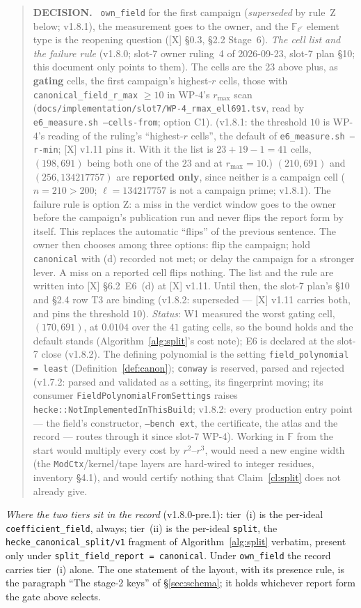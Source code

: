 \documentclass[11pt]{article}
\theoremstyle{remark}
\newcommand{\F}{\mathbb{F}}
\newcommand{\Flr}{\F_{\ell^r}}
\newenvironment{decisionbox}
  {\par\medskip\noindent\begin{quote}\textbf{DECISION.}\ }
  {\end{quote}\medskip}
\begin{document}
\begin{decisionbox}
\texttt{own\_field} for the first campaign (\emph{superseded} by rule~Z below; v1.8.1), the measurement goes to the owner, and the $\Flr$
element type is the reopening question ([X] \S0.3, \S2.2 Stage~6). \emph{The cell list and the
failure rule} (v1.8.0; slot-7 owner ruling~4 of 2026-09-23, slot-7 plan \S10; this document only
points to them). The cells are the $23$ above plus, as \textbf{gating} cells, the first
campaign's highest-$r$ cells, those with \texttt{canonical\_field\_r\_max} $\ge10$ in WP-4's
$r_{\max}$ scan (\texttt{docs/implementation/slot7/WP-4\_rmax\_ell691.tsv}, read by
\texttt{e6\_measure.sh --cells-from}; option C1). (v1.8.1: the threshold $10$ is WP-4's reading
of the ruling's ``highest-$r$ cells'', the default of \texttt{e6\_measure.sh --r-min}; [X] v1.11
pins it. With it the list is $23+19-1=41$ cells, $(198,691)$ being both one of the $23$ and at
$r_{\max}=10$.) $(210,691)$ and $(256,134217757)$ are
\textbf{reported only}, since neither is a campaign cell ($n=210>200$; $\ell=134217757$ is not a
campaign prime; v1.8.1). The failure rule is option Z: a miss in the verdict window goes to the
owner before the campaign's publication run and never flips the report form by itself. This
replaces the automatic ``flips'' of the previous sentence. The owner then chooses among three
options: flip the campaign; hold \texttt{canonical} with (d) recorded not met; or delay the
campaign for a stronger lever. A miss on a reported cell flips nothing. The list and the rule are written into [X] \S6.2~E6~(d) at [X] v1.11. Until then,
the slot-7 plan's \S10 and \S2.4 row T3 are binding (v1.8.2: superseded --- [X] v1.11 carries
both, and pins the threshold $10$). \emph{Status}: W1 measured the worst gating
cell, $(170,691)$, at $0.0104$ over the $41$ gating cells, so the bound holds and the default
stands (Algorithm~\ref{alg:split}'s cost note); E6 is declared at the slot-7 close (v1.8.2). The defining polynomial is
the setting \texttt{field\_polynomial = least} (Definition~\ref{def:canon}); \texttt{conway} is
reserved, parsed and rejected (v1.7.2: parsed and validated as a setting, its fingerprint
moving; its consumer \texttt{FieldPolynomialFromSettings} raises
\texttt{hecke::NotImplementedInThisBuild}; v1.8.2: every production entry point --- the
field's constructor, \texttt{--bench ext}, the certificate, the atlas and the record ---
routes through it since slot-7 WP-4). Working in $\F$ from the start would multiply
every cost by $r^2$--$r^3$, would need a new engine width (the \texttt{ModCtx}/kernel/tape layers
are hard-wired to integer residues, inventory \S4.1), and would certify nothing that
Claim~\ref{cl:split} does not already give.
\end{decisionbox}
\noindent\emph{Where the two tiers sit in the record} (v1.8.0-pre.1): tier~(i) is the per-ideal
\texttt{coefficient\_field}, always; tier~(ii) is the per-ideal \texttt{split}, the
\texttt{hecke\_canonical\_split/v1} fragment of Algorithm~\ref{alg:split} verbatim, present only
under \texttt{split\_field\_report = canonical}. Under \texttt{own\_field} the record carries
tier~(i) alone. The one statement of the layout, with its presence rule, is the paragraph ``The
stage-2 keys'' of \S\ref{sec:schema}; it holds whichever report form the gate above selects.
\end{document}
